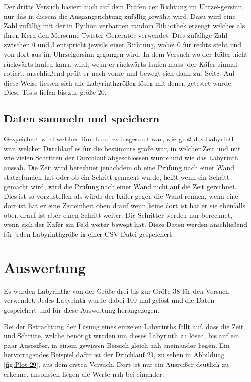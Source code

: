 \documentclass[11pt, a4paper]{article}
\begin{document}
Der dritte Versuch basiert auch auf dem Prüfen der Richtung im Uhrzei-gersinn, nur das in diesem die Ausgangsrichtung zufällig gewählt wird. Dazu wird eine Zahl zufällig mit der in Python verbauten random Bibliothek erzeugt welches als ihren Kern den Mersenne Twister Generator verwendet. Dies zufällige Zahl zwischen 0 und 3 entspricht jeweils einer Richtung, wobei 0 für rechts steht und von dort aus im Uhrzeigersinn gegangen wird. In dem Versuch wo der Käfer nicht rückwärts laufen kann, wird, wenn er rückwärts laufen muss, der Käfer einmal rotiert, anschließend prüft er nach vorne und bewegt sich dann zur Seite. Auf diese Weise liessen sich alle Labyrinthgrößen lösen mit denen getestet wurde. Diese Tests liefen bis zur größe 20.

\subsection{Daten sammeln und speichern}

Gespeichert wird welcher Durchlauf es insgesamt war, wie groß das Labyrinth war, welcher Durchlauf es für die bestimmte größe war, in welcher Zeit und mit wie vielen Schritten der Durchlauf abgeschlossen wurde und wie das Labyrinth aussah. Die Zeit wird berechnet jenachdem ob eine Prüfung nach einer Wand statgefunden hat oder ob ein Schritt gemacht wurde, heißt wenn ein Schritt gemacht wird, wird die Prüfung nach einer Wand nicht auf die Zeit gerechnet. Dies ist so vorzustellen als würde der Käfer gegen die Wand rennen, wenn eine dort ist hat er eine Zeiteinheit oben drauf wenn keine dort ist hat er sie ebenfalls oben drauf ist aber einen Schritt weiter. Die Schritter werden nur berechnet, wenn sich der Käfer ein Feld weiter bewegt hat.
Diese Daten werden anschließend für jeden Labyrinthgröße in einer CSV-Datei gespeichert.

\section{Auswertung}

Es wurden Labyrinthe von der Größe drei bis zur Größe 38 für den Versuch verwendet. Jedes Labyrinth wurde dabei 100 mal gelöst und die Daten gespeichert und für diese Auswertung herangezogen. 

\bigskip

Bei der Betrachtung der Lösung eines einzelen Labyrinths fällt auf, dass die Zeit und Schritte, welche benötigt wurden um dieses Labyrinth zu lösen, bis auf ein paar Ausreißer, in einem gewissen Bereich gleich nah aneinander liegen. Ein hervorragendes Beispiel dafür ist der Druchlauf 29, zu sehen in Abbildung \ref{fig:Plot 29}, aus dem ersten Versuch. Dort ist nur ein Ausreißer deutlich zu erkenne, ansonsten liegen die Werte nah bei einander.
\end{document}
